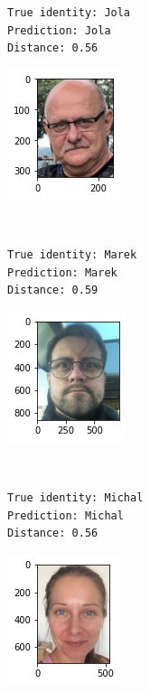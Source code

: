 \documentclass[11pt]{article}
\begin{document}
    \begin{Verbatim}[commandchars=\\\{\}]
True identity: Jola
Prediction: Jola
Distance: 0.56

    \end{Verbatim}

    \begin{center}
    \includegraphics{output_35_4}
    \end{center}
    { \hspace*{\fill} \\}
    
    \begin{Verbatim}[commandchars=\\\{\}]
True identity: Marek
Prediction: Marek
Distance: 0.59

    \end{Verbatim}

    \begin{center}
    \includegraphics{output_35_6}
    \end{center}
    { \hspace*{\fill} \\}
    
    \begin{Verbatim}[commandchars=\\\{\}]
True identity: Michal
Prediction: Michal
Distance: 0.56

    \end{Verbatim}

    \begin{center}
    \includegraphics{output_35_8}
    \end{center}
    { \hspace*{\fill} \\}
    
\end{document}
